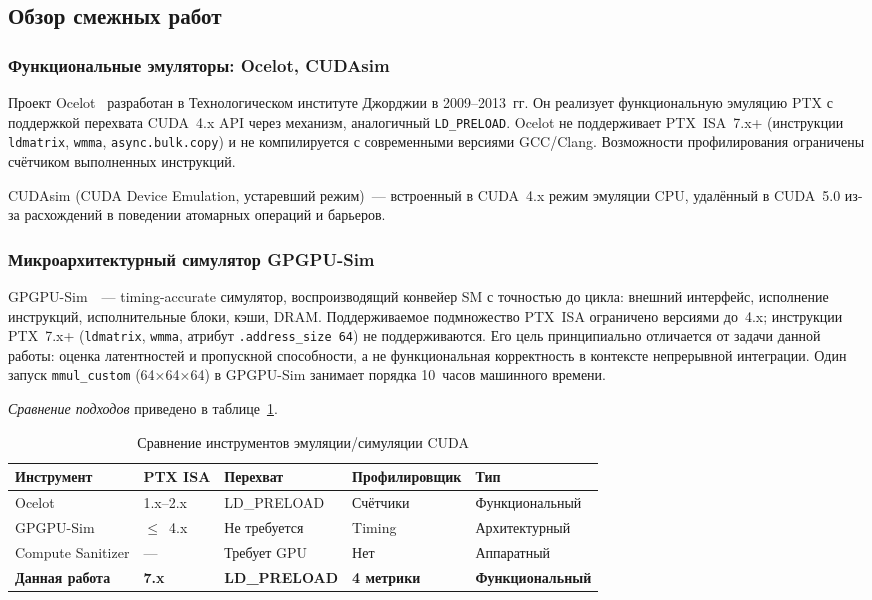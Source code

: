 \subsection{Обзор смежных работ}

\subsubsection{Функциональные эмуляторы: Ocelot, CUDAsim}

Проект Ocelot~\cite{Diamos2010} разработан в Технологическом институте
Джорджии в 2009--2013~гг. Он реализует функциональную эмуляцию PTX
с поддержкой перехвата CUDA~4.x API через механизм, аналогичный
\texttt{LD\_PRELOAD}. Ocelot не поддерживает PTX~ISA~7.x+ (инструкции
\texttt{ldmatrix}, \texttt{wmma}, \texttt{async.bulk.copy})
и не компилируется с современными версиями GCC/Clang. Возможности
профилирования ограничены счётчиком выполненных инструкций.

CUDAsim (CUDA Device Emulation, устаревший режим)~--- встроенный в CUDA~4.x
режим эмуляции CPU, удалённый в CUDA~5.0 из-за расхождений в поведении
атомарных операций и барьеров.

\subsubsection{Микроархитектурный симулятор GPGPU-Sim}

GPGPU-Sim~\cite{Bakhoda2009}~--- timing-accurate симулятор, воспроизводящий
конвейер SM с точностью до цикла: внешний интерфейс, исполнение инструкций,
исполнительные блоки, кэши, DRAM. Поддерживаемое подмножество PTX~ISA
ограничено версиями до~4.x; инструкции PTX~7.x+
(\texttt{ldmatrix}, \texttt{wmma}, атрибут \texttt{.address\_size~64})
не поддерживаются. Его цель принципиально отличается от задачи данной работы:
оценка латентностей и пропускной способности, а не функциональная
корректность в контексте непрерывной интеграции. Один запуск \texttt{mmul\_custom} (64×64×64)
в GPGPU-Sim занимает порядка 10~часов машинного времени.

\textit{Сравнение подходов} приведено в таблице~\ref{tab:related_work}.

\begin{table}[h]
  \caption{Сравнение инструментов эмуляции/симуляции CUDA}
  \label{tab:related_work}
  \centering
  \begin{tabularx}{\linewidth}{lXXXX}
    \toprule
    \textbf{Инструмент} & \textbf{PTX ISA} & \textbf{Перехват} &
    \textbf{Профилировщик} & \textbf{Тип} \\
    \midrule
    Ocelot           & 1.x--2.x  & LD\_PRELOAD  & Счётчики & Функциональный \\
    GPGPU-Sim        & $\leq$~4.x & Не требуется & Timing   & Архитектурный \\
    Compute Sanitizer & —         & Требует GPU  & Нет      & Аппаратный \\
    \textbf{Данная работа} & \textbf{7.x} & \textbf{LD\_PRELOAD} &
    \textbf{4 метрики} & \textbf{Функциональный} \\
    \bottomrule
  \end{tabularx}
\end{table}

\newpage
